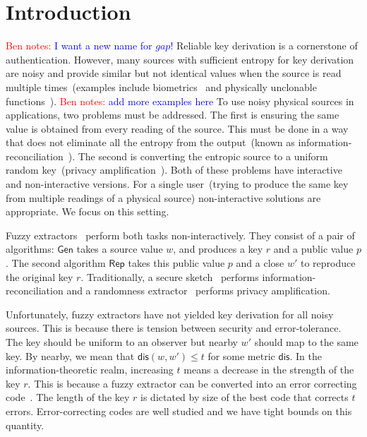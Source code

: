 \documentclass[11pt]{article}
\newcommand{\class}[1]{{\ensuremath{\mathsf{#1}}}}
\newcommand{\gen}{\ensuremath{\class{Gen}}\xspace}
\newcommand{\rep}{\ensuremath{\class{Rep}}\xspace}
\newcommand{\dis}{\ensuremath{\mathsf{dis}}}
\newcommand{\authnote}[2]{{\textcolor{red}{\textsf{#1 notes: }\textcolor{blue}{ #2}}\marginpar{\textcolor{red}{\textbf{!!!!!}}}}}
\newcommand{\authnote}[2]{}
\newcommand{\bnote}[1]{{\authnote{Ben}{#1}}}
\begin{document}
\section{Introduction}\label{sec:introduction}
\bnote{I want a new name for $gap$!}
Reliable key derivation is a cornerstone of authentication.  However, many sources with sufficient entropy for key derivation are noisy and provide similar but not identical values when the source is read multiple times~(examples include biometrics~\cite{daugman2004} and physically unclonable functions~\cite{pappu2002physical}). \bnote{add more examples here} To use noisy physical sources in applications, two problems must be addressed.  The first is ensuring the same value is obtained from every reading of the source.  This must be done in a way that does not eliminate all the entropy from the output~(known as information-reconciliation~\cite{bennett1988privacy}).  The second is converting the entropic source to a uniform random key~(privacy amplification~\cite{bennett1988privacy}).  Both of these problems have interactive and non-interactive versions.  For a single user~(trying to produce the same key from multiple readings of a physical source) non-interactive solutions are appropriate.  We focus on this setting.  %

Fuzzy extractors~\cite{DBLP:journals/siamcomp/DodisORS08} perform both tasks non-interactively.  They consist of a pair of algorithms: \gen takes a source value $w$, and produces a key $r$ and a public value $p$.  The second algorithm \rep takes this public value $p$ and a close $w'$ to reproduce the original key $r$.  Traditionally, a secure sketch~\cite{DBLP:journals/siamcomp/DodisORS08} performs information-reconciliation and a randomness extractor~\cite{nisan1993randomness} performs privacy amplification.

Unfortunately, fuzzy extractors have not yielded key derivation for all noisy sources.
This is because there is tension between security and error-tolerance.  The key should be uniform to an observer but nearby $w'$ should map to the same key.  By nearby, we mean that $\dis(w, w')\leq t$ for some metric $\dis$.  In the information-theoretic realm, increasing $t$ means a decrease in the strength of the key $r$.  This is because a fuzzy extractor can be converted into an error correcting code~\cite[Appendix C]{DBLP:journals/siamcomp/DodisORS08}.  The length of the key $r$ is dictated by size of the best code that corrects $t$ errors.  Error-correcting codes are well studied and we have tight bounds on this quantity. %
\end{document}
